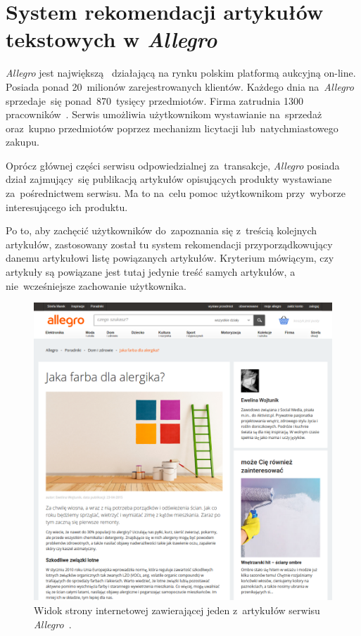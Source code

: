 \documentclass[pl]{minipw} %
\begin{document}
\section{System rekomendacji artykułów tekstowych w \textit{Allegro}}%
\textit{Allegro} jest największą~\cite{all_naj} działającą na rynku polskim platformą aukcyjną on-line. Posiada ponad 20~milionów zarejestrowanych klientów. Każdego dnia na~\textit{Allegro} sprzedaje~się ponad~870~tysięcy przedmiotów. Firma zatrudnia 1300 pracowników~\cite{allegro}. Serwis umożliwia użytkownikom wystawianie na~sprzedaż oraz~kupno przedmiotów poprzez mechanizm licytacji lub~natychmiastowego zakupu.

Oprócz głównej części serwisu odpowiedzialnej za~transakcje, \textit{Allegro} posiada dział zajmujący~się publikacją artykułów opisujących produkty wystawiane za~pośrednictwem serwisu. Ma to na~celu pomoc użytkownikom przy~wyborze interesującego ich produktu.

Po to, aby zachęcić użytkowników do~zapoznania się z~treścią kolejnych artykułów, zastosowany został tu system rekomendacji przyporządkowujący danemu artykułowi listę powiązanych artykułów. Kryterium mówiącym, czy artykuły są powiązane jest tutaj jedynie treść samych artykułów, a nie~wcześniejsze zachowanie użytkownika.

\begin{figure}[H]
	\centering
	\includegraphics[width=1\textwidth]{img/screen_allegro.png}
	\caption{Widok strony internetowej zawierającej jeden z~artykułów serwisu \textit{Allegro}~\cite{screen_allegro}.}
\end{figure}
\end{document}
